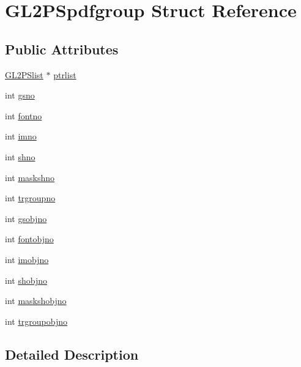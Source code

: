 \hypertarget{struct_g_l2_p_spdfgroup}{}\section{G\+L2\+P\+Spdfgroup Struct Reference}
\label{struct_g_l2_p_spdfgroup}
\subsection*{Public Attributes}
\begin{DoxyCompactItemize}
\item 
\hyperlink{struct_g_l2_p_slist}{G\+L2\+P\+Slist} $\ast$ \hyperlink{struct_g_l2_p_spdfgroup_ae61982c7b5704fb378003afddaa372a0}{ptrlist}
\item 
int \hyperlink{struct_g_l2_p_spdfgroup_a2cfb2eae774342666b632c550da6ed60}{gsno}
\item 
int \hyperlink{struct_g_l2_p_spdfgroup_ac18b08cce2f82cd4b3e870a5de018369}{fontno}
\item 
int \hyperlink{struct_g_l2_p_spdfgroup_a4129702ebefb954113a539c9e6c84629}{imno}
\item 
int \hyperlink{struct_g_l2_p_spdfgroup_a328d66530e598942292e1ca5c54cc195}{shno}
\item 
int \hyperlink{struct_g_l2_p_spdfgroup_ae4b35a90b5490ed66d2526865012dd6d}{maskshno}
\item 
int \hyperlink{struct_g_l2_p_spdfgroup_a31a492158553a24a1f34894aca2e1273}{trgroupno}
\item 
int \hyperlink{struct_g_l2_p_spdfgroup_af5a9629a4ff0d42c46927fadada346b4}{gsobjno}
\item 
int \hyperlink{struct_g_l2_p_spdfgroup_a15a0090229f1ef42d04ab4854f890bb2}{fontobjno}
\item 
int \hyperlink{struct_g_l2_p_spdfgroup_a6d4c378ecf26fa2eb26ce95c5df3f09b}{imobjno}
\item 
int \hyperlink{struct_g_l2_p_spdfgroup_a693eda3aa7df89ab96024c75875e0a5f}{shobjno}
\item 
int \hyperlink{struct_g_l2_p_spdfgroup_ad1cc1b17423f57a78f09e018eee75667}{maskshobjno}
\item 
int \hyperlink{struct_g_l2_p_spdfgroup_a26d86e3c60589a992cb0208f89951c52}{trgroupobjno}
\end{DoxyCompactItemize}


\subsection{Detailed Description}


